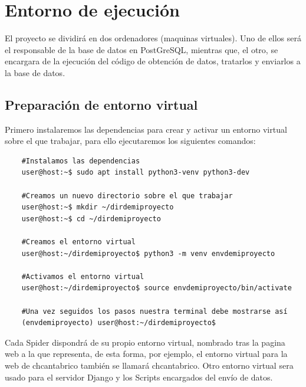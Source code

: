 \section{Entorno de ejecución}
El proyecto se dividirá en dos ordenadores (maquinas virtuales). Uno de ellos será el responsable de la base de datos en PostGreSQL, mientras que, el otro, se encargara de la ejecución del código de obtención de datos, tratarlos y enviarlos a la base de datos.

\subsection{Preparación de entorno virtual}
Primero instalaremos las dependencias para crear y activar un entorno virtual sobre el que trabajar, para ello ejecutaremos los siguientes comandos:

\begin{verbatim}
	#Instalamos las dependencias
	user@host:~$ sudo apt install python3-venv python3-dev
	
	#Creamos un nuevo directorio sobre el que trabajar
	user@host:~$ mkdir ~/dirdemiproyecto
	user@host:~$ cd ~/dirdemiproyecto
	
	#Creamos el entorno virtual
	user@host:~/dirdemiproyecto$ python3 -m venv envdemiproyecto
	
	#Activamos el entorno virtual
	user@host:~/dirdemiproyecto$ source envdemiproyecto/bin/activate
	
	#Una vez seguidos los pasos nuestra terminal debe mostrarse así
	(envdemiproyecto) user@host:~/dirdemiproyecto$
\end{verbatim}

Cada Spider dispondrá de su propio entorno virtual, nombrado tras la pagina web a la que representa, de esta forma, por ejemplo, el entorno virtual para la web de chcantabrico también se llamará chcantabrico.
Otro entorno virtual sera usado para el servidor Django y los Scripts encargados del envío de datos.

